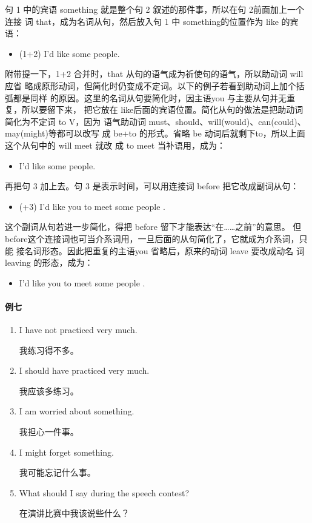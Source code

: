 句 1 中的宾语 something 就是整个句 2 叙述的那件事，所以在句 2前面加上一个连接
词 that，成为名词从句，然后放入句 1 中 something的位置作为 like 的宾语：
\begin{itemize}
\item (1+2) I'd like  some people.
\end{itemize}
附带提一下，1+2 合并时，that 从句的语气成为祈使句的语气，所以助动词 will应省
略成原形动词，但简化时仍变成不定词。以下的例子若看到助动词上加个括弧都是同样
的原因。这里的名词从句要简化时，因主语you 与主要从句并无重复，所以要留下来，
把它放在 like后面的宾语位置。简化从句的做法是把助动词简化为不定词 to V，因为
语气助动词 must、should、will(would)、can(could)、 may(might)等都可以改写
成 be+to 的形式。省略 be 动词后就剩下to，所以上面这个从句中的 will meet 就改
成 to meet 当补语用，成为：
\begin{itemize}
\item I'd like  some people.
\end{itemize}
再把句 3 加上去。句 3 是表示时间，可以用连接词 before 把它改成副词从句：
\begin{itemize}
\item (+3) I'd like you to meet some people .
\end{itemize}
这个副词从句若进一步简化，得把 before 留下才能表达“在……之前”的意思。
但 before这个连接词也可当介系词用，一旦后面的从句简化了，它就成为介系词，只能
接名词形态。因此把重复的主语you 省略后，原来的动词 leave 要改成动名
词 leaving 的形态，成为：
\begin{itemize}
\item I'd like you to meet some people .
\end{itemize}

\paragraph{例七}

\begin{enumerate}
\item I have not practiced very much.

  我练习得不多。
\item I should have practiced very much.

  我应该多练习。
\item I am worried about something.

  我担心一件事。
\item I might forget something.

  我可能忘记什么事。
\item What should I say during the speech contest?

  在演讲比赛中我该说些什么？
\end{enumerate}

